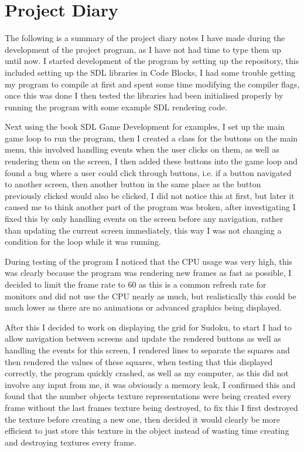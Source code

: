 \documentclass[]{final_report}
\begin{document}
\chapter*{Project Diary}

The following is a summary of the project diary notes I have made during the development of the project program, as I have not had time to type them up until now. I started development of the program by setting up the repository, this included setting up the SDL libraries in Code Blocks, I had some trouble getting my program to compile at first and spent some time modifying the compiler flags, once this was done I then tested the libraries had been initialised properly by running the program with some example SDL rendering code.

Next using the book SDL Game Development for examples, I set up the main game loop to run the program, then I created a class for the buttons on the main menu, this involved handling events when the user clicks on them, as well as rendering them on the screen, I then added these buttons into the game loop and found a bug where a user could click through buttons, i.e. if a button navigated to another screen, then another button in the same place as the button previously clicked would also be clicked, I did not notice this at first, but later it caused me to think another part of the program was broken, after investigating I fixed this by only handling events on the screen before any navigation, rather than updating the current screen immediately, this way I was not changing a condition for the loop while it was running.

During testing of the program I noticed that the CPU usage was very high, this was clearly because the program was rendering new frames as fast as possible, I decided to limit the frame rate to 60 as this is a common refresh rate for monitors and did not use the CPU nearly as much, but realistically this could be much lower as there are no animations or advanced graphics being displayed.

After this I decided to work on displaying the grid for Sudoku, to start I had to allow navigation between screens and update the rendered buttons as well as handling the events for this screen, I rendered lines to separate the squares and then rendered the values of these squares, when testing that this displayed correctly, the program quickly crashed, as well as my computer, as this did not involve any input from me, it was obviously a memory leak, I confirmed this and found that the number objects texture representations were being created every frame without the last frames texture being destroyed, to fix this I first destroyed the texture before creating a new one, then decided it would clearly be more efficient to just store this texture in the object instead of wasting time creating and destroying textures every frame.
\end{document}
